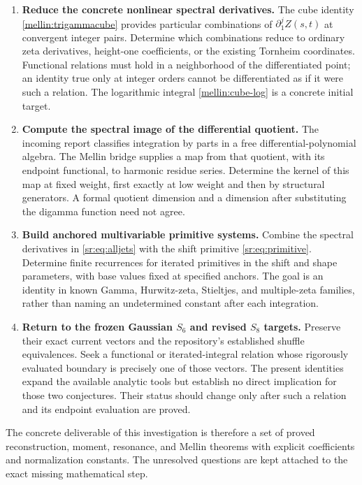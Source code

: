 \documentclass[11pt,letterpaper]{article}
\theoremstyle{definition}
\theoremstyle{remark}
\numberwithin{equation}{section}
\begin{document}
\begin{enumerate}[leftmargin=*,label=\textbf{Q\arabic*.}]
\item \textbf{Reduce the concrete nonlinear spectral derivatives.}
The cube identity \eqref{mellin:trigammacube} provides particular
combinations of $\partial_1^j Z(s,t)$ at convergent integer pairs.
Determine which combinations reduce to ordinary zeta derivatives,
height-one coefficients, or the existing Tornheim coordinates. Functional
relations must hold in a neighborhood of the differentiated point;
an identity true only at integer orders cannot be differentiated as if
it were such a relation. The logarithmic integral
\eqref{mellin:cube-log} is a concrete initial target.

\item \textbf{Compute the spectral image of the differential quotient.}
The incoming report classifies integration by parts in a free
differential-polynomial algebra. The Mellin bridge supplies a map from
that quotient, with its endpoint functional, to harmonic residue series.
Determine the kernel of this map at fixed weight, first exactly at low
weight and then by structural generators. A formal quotient dimension
and a dimension after substituting the digamma function need not agree.

\item \textbf{Build anchored multivariable primitive systems.}
Combine the spectral derivatives in \eqref{sr:eq:alljets} with the
shift primitive \eqref{sr:eq:primitive}. Determine finite recurrences for
iterated primitives in the shift and shape parameters, with base values
fixed at specified anchors. The goal is an identity in known Gamma,
Hurwitz-zeta, Stieltjes, and multiple-zeta families, rather than naming
an undetermined constant after each integration.

\item \textbf{Return to the frozen Gaussian $S_6$ and revised $S_8$ targets.}
Preserve their exact current vectors and the repository's established
shuffle equivalences. Seek a functional or iterated-integral relation
whose rigorously evaluated boundary is precisely one of those vectors.
The present identities expand the available analytic tools but establish
no direct implication for those two conjectures. Their status should
change only after such a relation and its endpoint evaluation are proved.

\end{enumerate}

The concrete deliverable of this investigation is therefore a set of
proved reconstruction, moment, resonance, and Mellin theorems with
explicit coefficients and normalization constants. The unresolved
questions are kept attached to the exact missing mathematical step.
\end{document}

